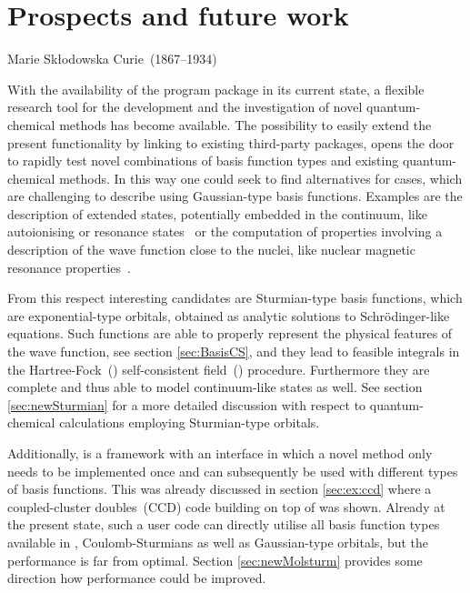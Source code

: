 \chapter{Prospects and future work}
\label{ch:Prospects}
{Marie Skłodowska Curie~(1867--1934)}

\noindent
With the availability of the \molsturm program package in its
current state, a flexible research tool
for the development and the investigation of novel quantum-chemical methods
has become available.
The possibility to easily extend the present functionality
by linking to existing third-party packages,
opens the door to rapidly test novel combinations of basis function types
and existing quantum-chemical methods.
In this way one could seek to find alternatives for cases,
which are challenging to describe using Gaussian-type basis functions.
Examples are the description of extended states,
potentially embedded in the continuum,
like autoionising or resonance states~\cite{Feshbach1958,Feshbach1962,Riss1993,Santra2002}
or the computation of properties involving a description
of the wave function close to the nuclei,
like nuclear magnetic resonance properties~\cite{Guell2008,Hoggan2009}.

From this respect interesting candidates are Sturmian-type basis functions,
which are exponential-type orbitals,
obtained as analytic solutions to Schrödinger-like equations.
Such functions are able to properly represent
the physical features of the wave function,
see section \ref{sec:BasisCS},
and they lead to feasible integrals
in the Hartree-Fock~(\HF) self-consistent field~(\SCF) procedure.
Furthermore they are complete
and thus able to model continuum-like states as well.
See section \ref{sec:newSturmian} for a more
detailed discussion with respect to
quantum-chemical calculations employing Sturmian-type orbitals.

Additionally, \molsturm is a framework with an interface
in which a novel method only needs to be implemented
once and can subsequently be
used with different types of basis functions.
This was already discussed in section \ref{sec:ex:ccd}
where a coupled-cluster doubles~(CCD) code building on top of \molsturm was shown.
Already at the present state, such a user code can
directly utilise all basis function types available in \molsturm,
\ie Coulomb-Sturmians as well as Gaussian-type orbitals,
but the performance is far from optimal.
Section \ref{sec:newMolsturm} provides some direction
how performance could be improved.

